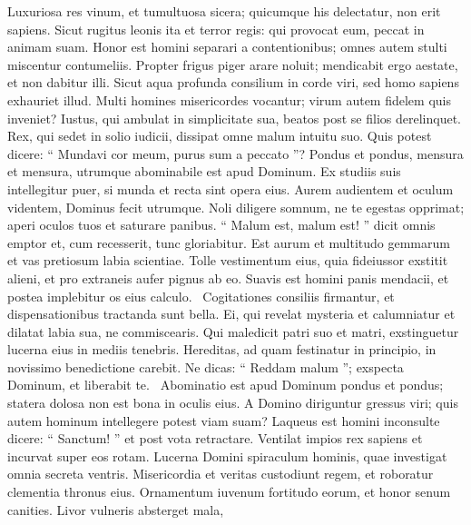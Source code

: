 \begin{biblechapter}
\begin{biblechapter}
\begin{biblechapter}
\begin{biblechapter}
\begin{biblechapter}
\begin{biblechapter}
\begin{biblechapter}
\begin{biblechapter}
\begin{biblechapter}
\begin{biblechapter}
\begin{biblechapter}
\begin{biblechapter}
\begin{biblechapter}
\begin{biblechapter}
\begin{biblechapter}
\begin{biblechapter}
\begin{biblechapter}
\begin{biblechapter}
\begin{biblechapter}
\begin{biblechapter}
 \verse Luxuriosa res vinum, et tumultuosa sicera;
 quicumque his delectatur, non erit sapiens.
 \verse Sicut rugitus leonis ita et terror regis:
 qui provocat eum, peccat in animam suam.
 \verse Honor est homini separari a contentionibus;
 omnes autem stulti miscentur contumeliis.
 \verse Propter frigus piger arare noluit;
 mendicabit ergo aestate, et non dabitur illi.
 \verse Sicut aqua profunda consilium in corde viri,
 sed homo sapiens exhauriet illud.
 \verse Multi homines misericordes vocantur;
 virum autem fidelem quis inveniet?
 \verse Iustus, qui ambulat in simplicitate sua,
 beatos post se filios derelinquet.
 \verse Rex, qui sedet in solio iudicii,
 dissipat omne malum intuitu suo.
 \verse Quis potest dicere: “ Mundavi cor meum,
 purus sum a peccato ”?
 \verse Pondus et pondus, mensura et mensura,
 utrumque abominabile est apud Dominum.
 \verse Ex studiis suis intellegitur puer,
 si munda et recta sint opera eius.
 \verse Aurem audientem et oculum videntem,
 Dominus fecit utrumque.
 \verse Noli diligere somnum, ne te egestas opprimat;
 aperi oculos tuos et saturare panibus.
 \verse “ Malum est, malum est! ” dicit omnis emptor
 et, cum recesserit, tunc gloriabitur.
 \verse Est aurum et multitudo gemmarum
 et vas pretiosum labia scientiae.
 \verse Tolle vestimentum eius, quia fideiussor exstitit alieni,
 et pro extraneis aufer pignus ab eo.
 \verse Suavis est homini panis mendacii,
 et postea implebitur os eius calculo. 
 \verse Cogitationes consiliis firmantur,
 et dispensationibus tractanda sunt bella.
 \verse Ei, qui revelat mysteria et calumniatur
 et dilatat labia sua, ne commiscearis.
 \verse Qui maledicit patri suo et matri,
 exstinguetur lucerna eius in mediis tenebris.
 \verse Hereditas, ad quam festinatur in principio,
 in novissimo benedictione carebit.
 \verse Ne dicas: “ Reddam malum ”;
 exspecta Dominum, et liberabit te. 
 \verse Abominatio est apud Dominum pondus et pondus;
 statera dolosa non est bona in oculis eius.
 \verse A Domino diriguntur gressus viri;
 quis autem hominum intellegere potest viam suam?
 \verse Laqueus est homini inconsulte dicere: “ Sanctum! ”
 et post vota retractare.
 \verse Ventilat impios rex sapiens
 et incurvat super eos rotam.
 \verse Lucerna Domini spiraculum hominis,
 quae investigat omnia secreta ventris.
 \verse Misericordia et veritas custodiunt regem,
 et roboratur clementia thronus eius.
 \verse Ornamentum iuvenum fortitudo eorum,
 et honor senum canities.
 \verse Livor vulneris absterget mala,

\end{biblechapter}
\end{biblechapter}
\end{biblechapter}
\end{biblechapter}
\end{biblechapter}
\end{biblechapter}
\end{biblechapter}
\end{biblechapter}
\end{biblechapter}
\end{biblechapter}
\end{biblechapter}
\end{biblechapter}
\end{biblechapter}
\end{biblechapter}
\end{biblechapter}
\end{biblechapter}
\end{biblechapter}
\end{biblechapter}
\end{biblechapter}
\end{biblechapter}
